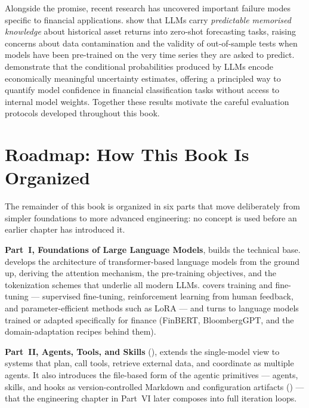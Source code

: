 \begin{context}
Alongside the promise, recent research has uncovered important failure modes specific
to financial applications.  \citet{didisheim2025memory}
show that LLMs carry \emph{predictable memorised knowledge} about historical asset
returns into zero-shot forecasting tasks, raising concerns about data contamination
and the validity of out-of-sample tests when models have been pre-trained on the very
time series they are asked to predict.  \citet{chen2024uncertainty} demonstrate that the conditional probabilities produced by
LLMs encode economically meaningful uncertainty estimates, offering a principled way
to quantify model confidence in financial classification tasks without access to
internal model weights.  Together these results motivate the careful evaluation
protocols developed throughout this book.

\end{context}

\section{Roadmap: How This Book Is Organized}
\label{sec:book-roadmap}

The remainder of this book is organized in six parts that move deliberately
from simpler foundations to more advanced engineering: no concept is used
before an earlier chapter has introduced it.

\textbf{Part~I, Foundations of Large Language Models}, builds the technical
base.   develops the architecture of
transformer-based language models from the ground up, deriving the attention
mechanism, the pre-training objectives, and the tokenization schemes that
underlie all modern LLMs.   covers training and
fine-tuning --- supervised fine-tuning, reinforcement learning from human
feedback, and parameter-efficient methods such as LoRA ---
and  turns to language models trained or
adapted specifically for finance (FinBERT, BloombergGPT, and the
domain-adaptation recipes behind them).

\textbf{Part~II, Agents, Tools, and Skills} (), extends
the single-model view to systems that plan, call tools, retrieve external
data, and coordinate as multiple agents.  It also introduces the file-based
form of the agentic primitives --- agents, skills, and hooks as
version-controlled Markdown and configuration artifacts
() --- that the engineering chapter in
Part~VI later composes into full iteration loops.

